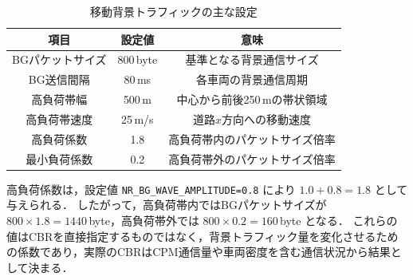 \begin{table}[t]
  \centering
  \caption{移動背景トラフィックの主な設定}
  \label{tab:bg_params}
  \begin{tabular}{ccc}
    \hline
    項目 & 設定値 & 意味 \\ \hline \hline
    BGパケットサイズ & 800\,byte & 基準となる背景通信サイズ \\
    BG送信間隔 & 80\,ms & 各車両の背景通信周期 \\
    高負荷帯幅 & 500\,m & 中心から前後250\,mの帯状領域 \\
    高負荷帯速度 & 25\,m/s & 道路$x$方向への移動速度 \\
    高負荷係数 & 1.8 & 高負荷帯内のパケットサイズ倍率 \\
    最小負荷係数 & 0.2 & 高負荷帯外のパケットサイズ倍率 \\ \hline
  \end{tabular}
\end{table}

高負荷係数は，設定値 \texttt{NR\_BG\_WAVE\_AMPLITUDE=0.8} により $1.0+0.8=1.8$ として与えられる．
したがって，高負荷帯内ではBGパケットサイズが $800\times1.8=1440$\,byte，高負荷帯外では $800\times0.2=160$\,byte となる．
これらの値はCBRを直接指定するものではなく，背景トラフィック量を変化させるための係数であり，実際のCBRはCPM通信量や車両密度を含む通信状況から結果として決まる．
